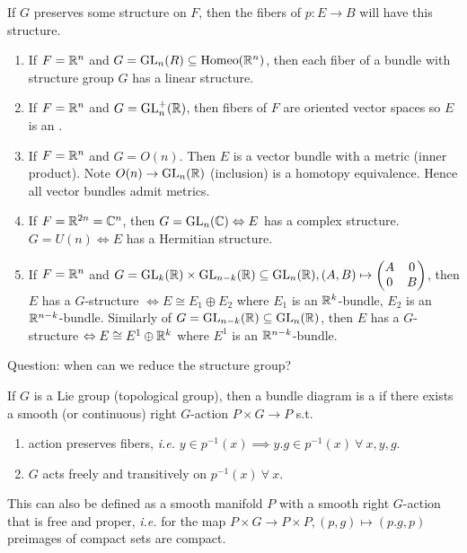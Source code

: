 \documentclass[12pt,class=article,crop=false]{standalone}
\begin{document}
\begin{remark}
If $ G$ preserves some structure on $ F$, then the fibers of  $ p:E \to B$ will have this structure.
\end{remark}
\begin{eg}
\begin{enumerate}[label=(\arabic*)]
	\item If $ F = \mathbb{R}^{n}$ and $ G= \text{GL}_{ n}( R) \subseteq  \text{Homeo}( \mathbb{R}^{n}) $, then each fiber of a bundle with structure group $ G$ has a linear structure.
	\item If  $ F = \mathbb{R}^{n}$ and $ G = \text{GL}_{ n}^{+}(\mathbb{R}) $, then fibers of $ F$ are oriented vector spaces so  $ E$ is an  .
	\item If $ F = \mathbb{R}^{n}$ and $ G = O(n)$. Then  $ E$ is a vector bundle with a metric (inner product). Note  $ O(n) \to \text{GL}_{ n}(\mathbb{R}) $ (inclusion) is a homotopy equivalence. Hence all vector bundles admit metrics.
	\item If $ F = \mathbb{R}^{2n} = \mathbb{C}^{n}$, then $ G = \text{GL}_{ n}( \mathbb{C}) \Leftrightarrow E$ has a complex structure. $ G = U(n) \iff E$ has a Hermitian structure.
	\item If $ F = \mathbb{R}^{n}$ and $ G= \text{GL}_{k}( \mathbb{R}) \times \text{GL}_{n-k}(\mathbb{R}) \subseteq \text{GL}_{ n}( \mathbb{R}) ,(A,B) \mapsto \begin{pmatrix} A&0\\0&B \end{pmatrix}  $, then $ E$ has a  $ G$-structure  $ \iff E \cong E_1 \oplus E_2$ where $ E_1$ is an $ \mathbb{R}^{k}$-bundle, $ E_2$ is an $ \mathbb{R}^{n-k}$-bundle. Similarly of $ G = \text{GL}_{n-k}(\mathbb{R}) \subseteq \text{GL}_{ n}(\mathbb{R}) $, then $ E$ has a  $ G$-structure  $ \Leftrightarrow E \cong E^{1} \oplus \mathbb{R}^{k}$ where $ E^{1}$ is an $ \mathbb{R}^{n-k}$-bundle.
\end{enumerate}
\end{eg}

Question: when can we reduce the structure group?

\begin{defn}
If $ G$ is a Lie group (topological group), then a bundle  diagram is a   if there exists a smooth (or continuous) right $ G$-action  $ P \times G \to P$  s.t.\ 
\begin{enumerate}[label=(\arabic*)]
	\item action preserves fibers, \emph{i.e.} $ y \in p ^{-1}(x) \implies y . g \in p ^{-1}(x) \ \forall \ x,y,g$.
	\item $ G$ acts freely and transitively on  $ p ^{-1}(x) \ \forall \ x$.
\end{enumerate}
\end{defn}
\begin{remark}
This can also be defined as a smooth manifold $ P$ with a smooth right  $ G$-action that is free and proper, \emph{i.e.} for the map $ P \times G \to P \times P, (p,g) \mapsto (p.g,p)$ preimages of compact sets are compact.
\end{remark}
\end{document}
